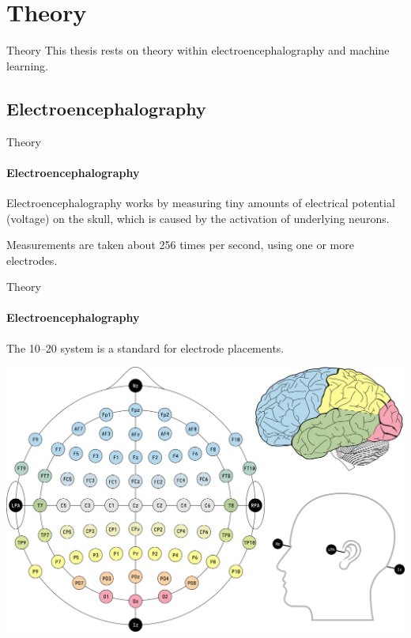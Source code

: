 \documentclass[xcolor={dvipsnames,table},12pt]{beamer}
\begin{document}
\section{Theory}
\begin{frame}{Theory}
    This thesis rests on theory within electroencephalography and machine learning.
\end{frame}

\subsection{Electroencephalography}
\begin{frame}{Theory}
    \framesubtitle{Electroencephalography}

    Electroencephalography works by measuring tiny amounts of electrical potential (voltage) on the skull, which is caused by the activation of underlying neurons.

    Measurements are taken about 256 times per second, using one or more electrodes.
\end{frame}

\begin{frame}{Theory}
    \framesubtitle{Electroencephalography}
    The 10--20 system is a standard for electrode placements.

    \begin{adjustbox}{width=0.8\textwidth,center,float=figure}
        \includegraphics{img/1020system-extended-with-extra-info.png}
    \end{adjustbox}
\end{frame}
\end{document}
